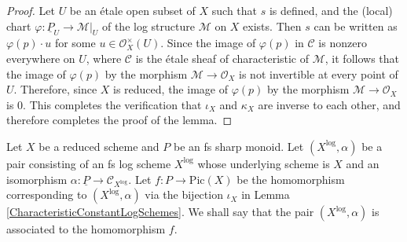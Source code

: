 \begin{proof}
  Let $U$ be an \'{e}tale open subset of $X$ such that $s$ is defined, and the (local) chart $\varphi \colon \underline{P}_U \to \mathcal{M}|_U$ of the log structure $\mathcal{M}$ on $X$ exists. Then $s$ can be written as $\varphi(p) \cdot u$ for some $u \in \mathcal{O}_X^\times(U)$. Since the image of $\varphi(p)$ in $\mathcal{C}$ is nonzero everywhere on $U$, where $\mathcal{C}$ is the \'{e}tale sheaf of characteristic of $\mathcal{M}$, it follows that the image of $\varphi(p)$ by the morphism $\mathcal{M} \to \mathcal{O}_X$ is not invertible at every point of $U$. Therefore, since $X$ is reduced, the image of $\varphi(p)$ by the morphism $\mathcal{M} \to \mathcal{O}_X$ is $0$. This completes the verification that $\iota_X$ and $\kappa_X$ are inverse to each other, and therefore completes the proof of the lemma.
\end{proof}

\begin{defn}
  Let $X$ be a reduced scheme and $P$ be an fs sharp monoid. Let $(X^\log, \alpha)$ be a pair consisting of an fs log scheme $X^\log$ whose underlying scheme is $X$ and an isomorphism $\alpha \colon \underline{P} \to \mathcal{C}_{X^\log}$. Let $f \colon P \to \mathrm{Pic}(X)$ be the homomorphism corresponding to $(X^\log, \alpha)$ via the bijection $\iota_X$ in Lemma \ref{CharacteristicConstantLogSchemes}. We shall say that the pair $(X^\log, \alpha)$ is associated to the homomorphism $f$.
\end{defn}

